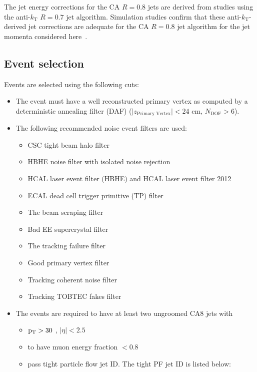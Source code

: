 The jet energy corrections for the CA $R=0.8$ jets are derived from studies using the
anti-$k_{\mathrm T}$ $R=0.7$ jet algorithm. Simulation studies confirm that these
anti-$k_{\mathrm T}$-derived jet corrections
are adequate for the CA $R=0.8$ jet algorithm for the jet momenta
considered here~\cite{topwtag_pas}.%


\subsection{Event selection}
\label{event_selection}

Events are selected using the following cuts:
\begin{itemize}
\item The event must have a well reconstructed primary vertex as computed by a deterministic annealing filter (DAF)
($\vert z_\text{Primary Vertex}\vert < 24$ cm, $N_\text{DOF} > 6$).
\item The following recommended noise event filters are used:
       \begin{itemize}
          \item  CSC tight beam halo filter
          \item  HBHE noise filter with isolated noise rejection
          \item  HCAL laser event filter (HBHE) and HCAL laser event filter 2012
          \item  ECAL dead cell trigger primitive (TP) filter
          \item  The beam scraping filter
          \item  Bad EE supercrystal filter
          \item  The tracking failure filter
          \item  Good primary vertex filter 
	  \item  Tracking coherent noise filter
	  \item  Tracking TOBTEC fakes filter  
       \end{itemize}
\item The events are required to have at least two ungroomed CA8 jets with
        \begin{itemize}
          \item $\mathrm{p_{T}} > 30$ \GeVcc, $|\eta| < 2.5$
          \item  to have muon energy fraction $< 0.8$
          \item pass tight particle flow jet ID. The tight PF jet ID is listed below:

\end{itemize}
\end{itemize}
